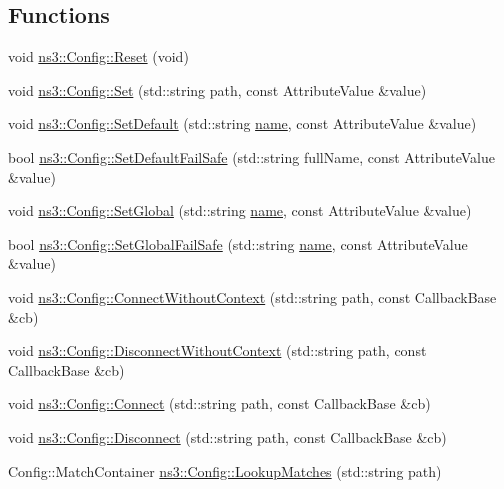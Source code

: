 \subsection*{Functions}
\begin{DoxyCompactItemize}
\item 
void \hyperlink{group__config_ga2c1b65724f42f8c72276d7e7ad6df6db}{ns3\+::\+Config\+::\+Reset} (void)
\item 
void \hyperlink{group__config_gadce03667ec621d64ce4aace85d9bcfd0}{ns3\+::\+Config\+::\+Set} (std\+::string path, const Attribute\+Value \&value)
\item 
void \hyperlink{group__config_ga2e7882df849d8ba4aaad31c934c40c06}{ns3\+::\+Config\+::\+Set\+Default} (std\+::string \hyperlink{generate__test__data__lte__spectrum__model_8m_ab74e6bf80237ddc4109968cedc58c151}{name}, const Attribute\+Value \&value)
\item 
bool \hyperlink{group__config_ga54361b707f31481b11d19f03495cb045}{ns3\+::\+Config\+::\+Set\+Default\+Fail\+Safe} (std\+::string full\+Name, const Attribute\+Value \&value)
\item 
void \hyperlink{group__config_ga0e12663a7bd119b65d0a219a578f2a3c}{ns3\+::\+Config\+::\+Set\+Global} (std\+::string \hyperlink{generate__test__data__lte__spectrum__model_8m_ab74e6bf80237ddc4109968cedc58c151}{name}, const Attribute\+Value \&value)
\item 
bool \hyperlink{group__config_gaccae07399fb761a399558a0a03c52dec}{ns3\+::\+Config\+::\+Set\+Global\+Fail\+Safe} (std\+::string \hyperlink{generate__test__data__lte__spectrum__model_8m_ab74e6bf80237ddc4109968cedc58c151}{name}, const Attribute\+Value \&value)
\item 
void \hyperlink{group__config_gaa2f896aa7021f95fffabc80b2ec22e08}{ns3\+::\+Config\+::\+Connect\+Without\+Context} (std\+::string path, const Callback\+Base \&cb)
\item 
void \hyperlink{group__config_ga9979e293cae542020fada4824d0b3702}{ns3\+::\+Config\+::\+Disconnect\+Without\+Context} (std\+::string path, const Callback\+Base \&cb)
\item 
void \hyperlink{group__config_ga4014f151241cd0939b6cb64409605736}{ns3\+::\+Config\+::\+Connect} (std\+::string path, const Callback\+Base \&cb)
\item 
void \hyperlink{group__config_ga33e975bd2ed84e3353b2a3356d90fc1d}{ns3\+::\+Config\+::\+Disconnect} (std\+::string path, const Callback\+Base \&cb)
\item 
Config\+::\+Match\+Container \hyperlink{group__config_ga74aeb63f8f50b4a98043351552ef7db6}{ns3\+::\+Config\+::\+Lookup\+Matches} (std\+::string path)

\end{DoxyCompactItemize}

